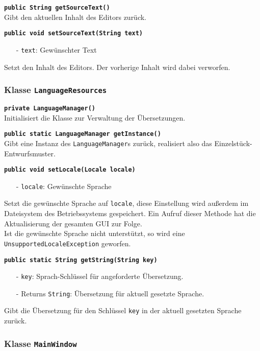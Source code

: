 \documentclass[parskip=full,11pt,twoside]{scrartcl}
\begin{document}
\textbf{\texttt{public String getSourceText()}}\\
Gibt den aktuellen Inhalt des Editors zurück.

\textbf{\texttt{public void setSourceText(String text)}}
\begin{itemize}[noitemsep]
	\item[-] \texttt{text}: Gewünschter Text
\end{itemize}
Setzt den Inhalt des Editors. Der vorherige Inhalt wird dabei verworfen.

\subsubsection{Klasse \texttt{LanguageResources}}

\textbf{\texttt{private LanguageManager()}}\\
Initialisiert die Klasse zur Verwaltung der Übersetzungen.

\textbf{\texttt{public static LanguageManager getInstance()}}\\
Gibt eine Instanz des \texttt{LanguageManager}s zurück, realisiert also das Einzelstück-Entwurfsmuster.

\textbf{\texttt{public void setLocale(Locale locale)}}
\begin{itemize}[noitemsep]
	\item[-] \texttt{locale}: Gewünschte Sprache
\end{itemize}
Setzt die gewünschte Sprache auf \texttt{locale}, diese Einstellung wird außerdem im Dateisystem des Betriebssystems gespeichert. Ein Aufruf dieser Methode hat die Aktualisierung der gesamten GUI zur Folge.\\
Ist die gewünschte Sprache nicht unterstützt, so wird eine \texttt{UnsupportedLocaleException} geworfen.

\textbf{\texttt{public static String getString(String key)}}
\begin{itemize}[noitemsep]
	\item[-] \texttt{key}: Sprach-Schlüssel für angeforderte Übersetzung.
	\item[-] Returns \texttt{String}: Übersetzung für aktuell gesetzte Sprache.
\end{itemize}
Gibt die Übersetzung für den Schlüssel \texttt{key} in der aktuell gesetzten Sprache zurück.

\subsubsection{Klasse \texttt{MainWindow}}
\end{document}
